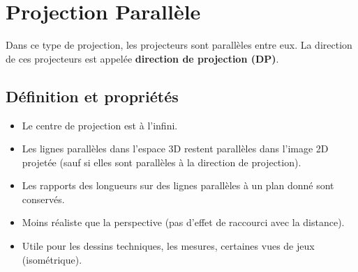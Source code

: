 \section{Projection Parallèle}
Dans ce type de projection, les projecteurs sont parallèles entre eux. La direction de ces projecteurs est appelée \textbf{direction de projection (DP)}.
\subsection{Définition et propriétés}
\begin{itemize}
    \item Le centre de projection est à l'infini.
    \item Les lignes parallèles dans l'espace 3D restent parallèles dans l'image 2D projetée (sauf si elles sont parallèles à la direction de projection).
    \item Les rapports des longueurs sur des lignes parallèles à un plan donné sont conservés.
    \item Moins réaliste que la perspective (pas d'effet de raccourci avec la distance).
    \item Utile pour les dessins techniques, les mesures, certaines vues de jeux (isométrique).
\end{itemize}
